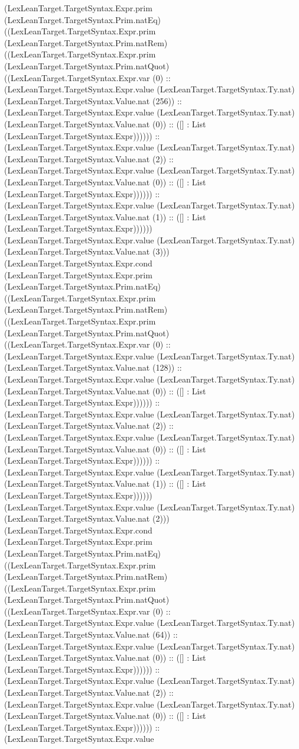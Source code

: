 \documentclass[11pt]{article}
\begin{document}
(LexLeanTarget.TargetSyntax.Expr.prim (LexLeanTarget.TargetSyntax.Prim.natEq) ((LexLeanTarget.TargetSyntax.Expr.prim (LexLeanTarget.TargetSyntax.Prim.natRem) ((LexLeanTarget.TargetSyntax.Expr.prim (LexLeanTarget.TargetSyntax.Prim.natQuot) ((LexLeanTarget.TargetSyntax.Expr.var (0) :: (LexLeanTarget.TargetSyntax.Expr.value (LexLeanTarget.TargetSyntax.Ty.nat) (LexLeanTarget.TargetSyntax.Value.nat (256)) :: (LexLeanTarget.TargetSyntax.Expr.value (LexLeanTarget.TargetSyntax.Ty.nat) (LexLeanTarget.TargetSyntax.Value.nat (0)) :: ([] : List (LexLeanTarget.TargetSyntax.Expr)))))) :: (LexLeanTarget.TargetSyntax.Expr.value (LexLeanTarget.TargetSyntax.Ty.nat) (LexLeanTarget.TargetSyntax.Value.nat (2)) :: (LexLeanTarget.TargetSyntax.Expr.value (LexLeanTarget.TargetSyntax.Ty.nat) (LexLeanTarget.TargetSyntax.Value.nat (0)) :: ([] : List (LexLeanTarget.TargetSyntax.Expr)))))) :: (LexLeanTarget.TargetSyntax.Expr.value (LexLeanTarget.TargetSyntax.Ty.nat) (LexLeanTarget.TargetSyntax.Value.nat (1)) :: ([] : List (LexLeanTarget.TargetSyntax.Expr)))))) (LexLeanTarget.TargetSyntax.Expr.value (LexLeanTarget.TargetSyntax.Ty.nat) (LexLeanTarget.TargetSyntax.Value.nat (3))) (LexLeanTarget.TargetSyntax.Expr.cond (LexLeanTarget.TargetSyntax.Expr.prim (LexLeanTarget.TargetSyntax.Prim.natEq) ((LexLeanTarget.TargetSyntax.Expr.prim (LexLeanTarget.TargetSyntax.Prim.natRem) ((LexLeanTarget.TargetSyntax.Expr.prim (LexLeanTarget.TargetSyntax.Prim.natQuot) ((LexLeanTarget.TargetSyntax.Expr.var (0) :: (LexLeanTarget.TargetSyntax.Expr.value (LexLeanTarget.TargetSyntax.Ty.nat) (LexLeanTarget.TargetSyntax.Value.nat (128)) :: (LexLeanTarget.TargetSyntax.Expr.value (LexLeanTarget.TargetSyntax.Ty.nat) (LexLeanTarget.TargetSyntax.Value.nat (0)) :: ([] : List (LexLeanTarget.TargetSyntax.Expr)))))) :: (LexLeanTarget.TargetSyntax.Expr.value (LexLeanTarget.TargetSyntax.Ty.nat) (LexLeanTarget.TargetSyntax.Value.nat (2)) :: (LexLeanTarget.TargetSyntax.Expr.value (LexLeanTarget.TargetSyntax.Ty.nat) (LexLeanTarget.TargetSyntax.Value.nat (0)) :: ([] : List (LexLeanTarget.TargetSyntax.Expr)))))) :: (LexLeanTarget.TargetSyntax.Expr.value (LexLeanTarget.TargetSyntax.Ty.nat) (LexLeanTarget.TargetSyntax.Value.nat (1)) :: ([] : List (LexLeanTarget.TargetSyntax.Expr)))))) (LexLeanTarget.TargetSyntax.Expr.value (LexLeanTarget.TargetSyntax.Ty.nat) (LexLeanTarget.TargetSyntax.Value.nat (2))) (LexLeanTarget.TargetSyntax.Expr.cond (LexLeanTarget.TargetSyntax.Expr.prim (LexLeanTarget.TargetSyntax.Prim.natEq) ((LexLeanTarget.TargetSyntax.Expr.prim (LexLeanTarget.TargetSyntax.Prim.natRem) ((LexLeanTarget.TargetSyntax.Expr.prim (LexLeanTarget.TargetSyntax.Prim.natQuot) ((LexLeanTarget.TargetSyntax.Expr.var (0) :: (LexLeanTarget.TargetSyntax.Expr.value (LexLeanTarget.TargetSyntax.Ty.nat) (LexLeanTarget.TargetSyntax.Value.nat (64)) :: (LexLeanTarget.TargetSyntax.Expr.value (LexLeanTarget.TargetSyntax.Ty.nat) (LexLeanTarget.TargetSyntax.Value.nat (0)) :: ([] : List (LexLeanTarget.TargetSyntax.Expr)))))) :: (LexLeanTarget.TargetSyntax.Expr.value (LexLeanTarget.TargetSyntax.Ty.nat) (LexLeanTarget.TargetSyntax.Value.nat (2)) :: (LexLeanTarget.TargetSyntax.Expr.value (LexLeanTarget.TargetSyntax.Ty.nat) (LexLeanTarget.TargetSyntax.Value.nat (0)) :: ([] : List (LexLeanTarget.TargetSyntax.Expr)))))) :: (LexLeanTarget.TargetSyntax.Expr.value 
\end{document}
